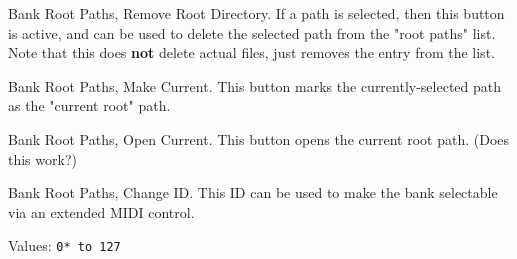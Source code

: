    Bank Root Paths, Remove Root Directory.
   If a path is selected, then this button is active, and can be used to
   delete the selected path from the "root paths" list. Note that this does
   \textbf{not} delete actual files, just removes the entry from the list.

   Bank Root Paths, Make Current.
   This button marks the currently-selected path as the "current root" path.

   Bank Root Paths, Open Current.
   This button opens the current root path.
   (Does this work?)

   Bank Root Paths, Change ID.
   This ID can be used to make the bank selectable via an extended MIDI
   control.

   Values: \texttt{0* to 127}

